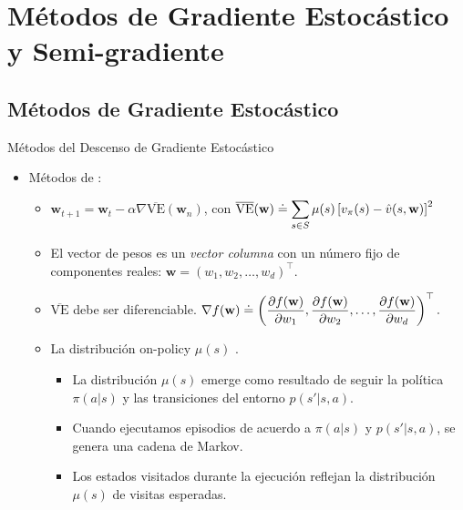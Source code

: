 \documentclass[10pt, envcountsect, handout, aspectratio=1610, hyperref={hypertexnames=true}]{beamer}
\begin{document}
\section{Métodos de Gradiente Estocástico y Semi-gradiente}

\subsection{Métodos de Gradiente Estocástico}

\begin{frame}{Métodos del Descenso de Gradiente Estocástico}
	\begin{itemize}
		\item Métodos de : 
		\begin{itemize}
			\item $\mathbf{w}_{t+1} = \mathbf{w}_t - \alpha \nabla \overline{\text{VE}}(\mathbf{w}_n)$, \qquad con  $\displaystyle \overline{\text{VE}}(\mathbf{w}) \doteq \sum_{s \in S} \mu(s) \left[ v_\pi(s) - \hat{v}(s, \mathbf{w}) \right]^2$
			
			
			\item El vector de pesos es un \textit{vector columna} con un número fijo de componentes reales: $\mathbf{w} = (w_1, w_2, \dots, w_d)^\top$.
			
			\item $\overline{\text{VE}}$ debe ser diferenciable.
			$\displaystyle
				\nabla f(\mathbf{w}) \doteq \left( \frac{\partial f(\mathbf{w})}{\partial w_1}, \frac{\partial f(\mathbf{w})}{\partial w_2}, \ldots, \frac{\partial f(\mathbf{w})}{\partial w_d} \right)^\top. 
			$
			
			\item La distribución on-policy $\mu(s)$ .
			
			\begin{itemize}
				\item La distribución $\mu(s)$ emerge como resultado de seguir la política $\pi(a|s)$ y las transiciones del entorno $p(s'|s, a)$.
				\item Cuando ejecutamos episodios de acuerdo a $\pi(a|s)$ y $p(s'|s,a)$, se genera una cadena de Markov.
				\item Los estados visitados durante la ejecución reflejan la distribución $\mu(s)$ de visitas esperadas.
			\end{itemize}
		\end{itemize}
			

\end{itemize}
\end{frame}
\end{document}
